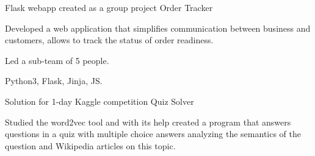 

\begin{cventries}

  \cventry
    {Flask webapp created as a group project \acvHeaderSocialSep{}} %
    {Order Tracker} %
    {} %
    {} %
    {
      \begin{cvitems} %
        \item {Developed a web application that simplifies communication between business and customers, allows to track the status of order readiness.}
        \item {Led a sub-team of 5 people.}
        \item {Python3, Flask, Jinja, JS.}
      \end{cvitems}
    }

  \cventry
    {Solution for 1-day Kaggle competition \acvHeaderSocialSep{}} %
    {Quiz Solver} %
    {} %
    {} %
    {
      \begin{cvitems} %
        \item {Studied the word2vec tool and with its help created a program that answers questions in a quiz with multiple choice answers analyzing the semantics of the question and Wikipedia articles on this topic.}
      \end{cvitems}
    }

\end{cventries}

